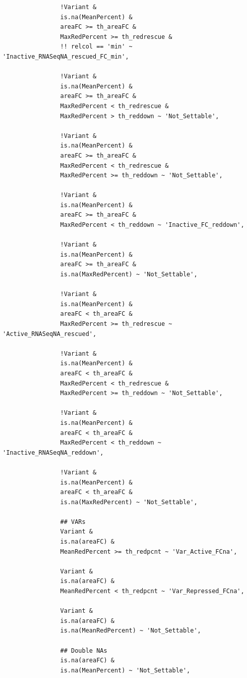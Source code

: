 \documentclass[11pt]{article}
\begin{document}
\begin{verbatim}
                !Variant &
                is.na(MeanPercent) &
                areaFC >= th_areaFC &
                MaxRedPercent >= th_redrescue &
                !! relcol == 'min' ~ 'Inactive_RNASeqNA_rescued_FC_min',

                !Variant &
                is.na(MeanPercent) &
                areaFC >= th_areaFC &
                MaxRedPercent < th_redrescue &
                MaxRedPercent > th_reddown ~ 'Not_Settable',

                !Variant &
                is.na(MeanPercent) &
                areaFC >= th_areaFC &
                MaxRedPercent < th_redrescue &
                MaxRedPercent >= th_reddown ~ 'Not_Settable',

                !Variant &
                is.na(MeanPercent) &
                areaFC >= th_areaFC &
                MaxRedPercent < th_reddown ~ 'Inactive_FC_reddown',

                !Variant &
                is.na(MeanPercent) &
                areaFC >= th_areaFC &
                is.na(MaxRedPercent) ~ 'Not_Settable',

                !Variant &
                is.na(MeanPercent) &
                areaFC < th_areaFC &
                MaxRedPercent >= th_redrescue ~ 'Active_RNASeqNA_rescued',

                !Variant &
                is.na(MeanPercent) &
                areaFC < th_areaFC &
                MaxRedPercent < th_redrescue &
                MaxRedPercent >= th_reddown ~ 'Not_Settable',

                !Variant &
                is.na(MeanPercent) &
                areaFC < th_areaFC &
                MaxRedPercent < th_reddown ~ 'Inactive_RNASeqNA_reddown',

                !Variant &
                is.na(MeanPercent) &
                areaFC < th_areaFC &
                is.na(MaxRedPercent) ~ 'Not_Settable',

                ## VARs
                Variant &
                is.na(areaFC) &
                MeanRedPercent >= th_redpcnt ~ 'Var_Active_FCna',

                Variant &
                is.na(areaFC) &
                MeanRedPercent < th_redpcnt ~ 'Var_Repressed_FCna',

                Variant &
                is.na(areaFC) &
                is.na(MeanRedPercent) ~ 'Not_Settable',

                ## Double NAs
                is.na(areaFC) &
                is.na(MeanPercent) ~ 'Not_Settable',


\end{verbatim}
\end{document}
